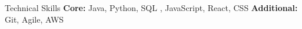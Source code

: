 \begin{rSection}{Technical Skills}
\textbf{Core:} Java, Python, SQL \iffrontend, JavaScript, React, CSS \fi
\textbf{Additional:} Git, Agile, AWS
\end{rSection}